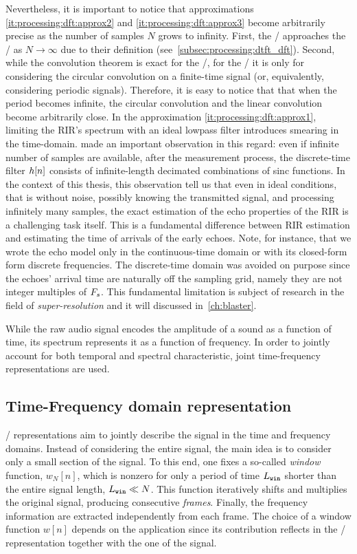 Nevertheless, it is important to notice that approximations \ref{it:processing:dft:approx2} and \ref{it:processing:dft:approx3} become arbitrarily precise as the number of samples $N$ grows to infinity.
First, the \DFT/ approaches the \DTFT/ as $N\to\infty$ due to their definition (see~\cref{subsec:processing:dtft_dft}).
Second, while the convolution theorem is exact for the \DTFT/, for the \DFT/ it is only for  considering the circular convolution on a finite-time signal (or, equivalently, considering periodic signals).
Therefore, it is easy to notice that that when the period becomes infinite, the circular convolution and the linear convolution become arbitrarily close.
In the approximation \ref{it:processing:dft:approx1}, limiting the \ac{RIR}'s spectrum with an ideal lowpass filter introduces smearing in the time-domain.
\citeauthor{tukuljac2018mulan} made an important observation in this regard:
even if infinite number of samples are available, after the measurement process, the discrete-time filter ${h}[n]$ consists of infinite-length decimated combinations of sinc functions.
In the context of this thesis, this observation tell us that even in ideal conditions, that is without noise, possibly knowing the transmitted signal, and processing infinitely many samples, the exact estimation of the echo properties of the \ac{RIR} is a challenging task itself.
This is a fundamental difference between \ac{RIR} estimation and estimating the time of arrivals of the early echoes.
Note, for instance, that we wrote the echo model only in the continuous-time domain or with its closed-form form discrete frequencies.
The discrete-time domain was avoided on purpose since the echoes' arrival time are naturally off the sampling grid, namely they are not integer multiples of $F_s$.
This fundamental limitation is subject of research in the field of \textit{super-resolution} and it will discussed in~\cref{ch:blaster}.

\mynewline
While the raw audio signal encodes the amplitude of a sound as a function of time, its spectrum represents it as a function of frequency.
In order to jointly account for both temporal and spectral characteristic, joint time-frequency representations are used.

\subsection{Time-Frequency domain representation}\label{subsec:processing:stft}
\TFdef/ representations aim to jointly describe the signal in the time and frequency domains.
Instead of considering the entire signal, the main idea is to consider only a small section of the signal.
To this end, one fixes a so-called \textit{window} function, $w_N[n]$, which is nonzero for only a period of time $L_\mathtt{win}$ shorter than the entire signal length, $L_\mathtt{win} \ll N$.
This function iteratively shifts and multiplies the original signal, producing consecutive \textit{frames}.
Finally, the frequency information are extracted independently from each frame.
The choice of a window function $w[n]$ depends on the application since its contribution reflects in the \TF/ representation together with the
one of the signal.

